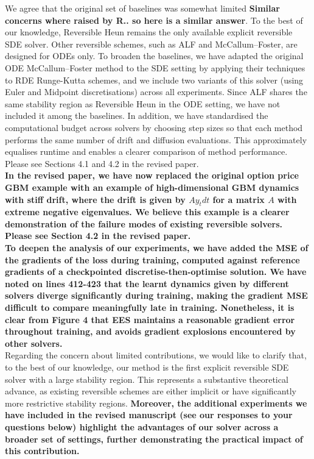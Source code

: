 \documentclass{article}
\newcommand{\TODO}[1]{\color{red}\textbf{{#1}}\color{black}}
\newcommand{\CRIS}[1]{\color{blue}\textbf{{#1}}\color{black}}
\newcommand{\NEW}[1]{\color{maroon}\textbf{{#1}}\color{black}}
\begin{document}
We agree that the original set of baselines was somewhat limited \CRIS{Similar concerns where raised by R.. so here is a similar answer}. To the best of our knowledge, Reversible Heun remains the only available explicit reversible SDE solver. Other reversible schemes, such as ALF and McCallum–Foster, are designed for ODEs only. To broaden the baselines, we have adapted the original ODE McCallum–Foster method to the SDE setting by applying their techniques to RDE Runge-Kutta schemes, and we include two variants of this solver (using Euler and Midpoint discretisations) across all experiments. Since ALF shares the same stability region as Reversible Heun in the ODE setting, we have not included it among the baselines. In addition, we have standardised the computational budget across solvers by choosing step sizes so that each method performs the same number of drift and diffusion evaluations. This approximately equalises runtime and enables a clearer comparison of method performance. Please see Sections 4.1 and 4.2 in the revised paper.\\

\NEW{In the revised paper, we have now replaced the original option price GBM example with an example of high-dimensional GBM dynamics with stiff drift, where the drift is given by $A y_t dt$ for a matrix $A$ with extreme negative eigenvalues. We believe this example is a clearer demonstration of the failure modes of existing reversible solvers. Please see Section 4.2 in the revised paper.}\\

\NEW{To deepen the analysis of our experiments, we have added the MSE of the gradients of the loss during training, computed against reference gradients of a checkpointed discretise-then-optimise solution. We have noted on lines 412-423 that the learnt dynamics given by different solvers diverge significantly during training, making the gradient MSE difficult to compare meaningfully late in training. Nonetheless, it is clear from Figure 4 that EES maintains a reasonable gradient error throughout training, and avoids gradient explosions encountered by other solvers.}\\

Regarding the concern about limited contributions, we would like to clarify that, to the best of our knowledge, our method is the first explicit reversible SDE solver with a large stability region. This represents a substantive theoretical advance, as existing reversible schemes are either implicit or have significantly more restrictive stability regions. \TODO{Moreover, the additional experiments we have included in the revised manuscript (see our responses to your questions below) highlight the advantages of our solver across a broader set of settings, further demonstrating the practical impact of this contribution.} \\
\end{document}
